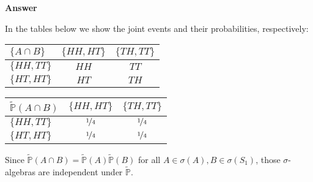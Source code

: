 \documentclass[11pt]{article}
\renewcommand\P{\mathbb{P}} %
\newenvironment{hwanswer}
    {
        \vspace{2mm}
        {\bfseries Answer}
        \vspace{-\abovedisplayskip}
        \begin{center}
            \begin{tcolorbox}[
                width=0.95\textwidth,
                colback=white,
                colframe=white,
                opacityback=0,
                opacityframe=0,
                boxrule=0pt,
                frame hidden,
                breakable,
                before upper={\parindent15pt} %
            ]
            \lineskip=0pt %
    }
    {
        \end{tcolorbox}
        \end{center}
        \vspace{4mm}
    }
\begin{document}
\begin{hwanswer}
\begin{enumerate}[(a)]
            In the tables below we show the joint events and their probabilities,
            respectively:
            \begin{table}[H]
                \centering
                \begin{tabular}{l c c}
                    \toprule
                    $\{A \cap B\}$ & $\{ HH, HT \}$ & $\{ TH, TT \}$ \\
                    \midrule
                    $\{ HH, TT \}$ & $HH$ & $TT$ \\
                    $\{ HT, HT \}$ & $HT$ & $TH$ \\
                    \bottomrule
                \end{tabular}%
                \hspace{1em}
                \begin{tabular}{l c c}
                    \toprule
                    $\widetilde{\P}(A \cap B)$ & $\{ HH, HT \}$ & $\{ TH, TT \}$ \\
                    \midrule
                    $\{ HH, TT \}$ & $\nicefrac{1}{4}$ & $\nicefrac{1}{4}$ \\
                    $\{ HT, HT \}$ & $\nicefrac{1}{4}$ & $\nicefrac{1}{4}$ \\
                    \bottomrule
                \end{tabular}
            \end{table}
            \noindent Since $\widetilde{\P}(A \cap B) = \widetilde{\P}(A) \widetilde{\P}(B)$
            for all $A \in \sigma(A), B \in \sigma(S_1)$, those $\sigma$-algebras are
            independent under $\widetilde{\P}$.


\end{enumerate}
\end{hwanswer}
\end{document}
